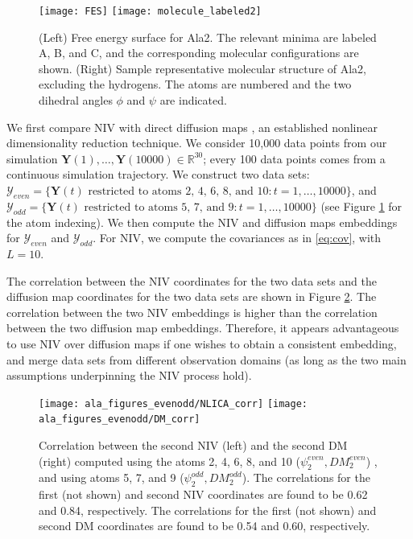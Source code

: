 \documentclass[aip,jcp,preprint]{revtex4-1}
\begin{document}
\begin{figure}[ht]
    \texttt{[image: FES]}
    \texttt{[image: molecule\_labeled2]}
    \caption{(Left) Free energy surface for Ala2. The relevant minima are labeled A, B, and C, and the corresponding molecular configurations are shown.
    (Right) Sample representative molecular structure of Ala2, excluding the hydrogens. The atoms are numbered and the two dihedral angles $\phi$ and $\psi$ are indicated.}
    \label{fig:ala_fes}
\end{figure}


We first compare NIV with direct diffusion maps \cite{coifman2005geometric}, an established nonlinear dimensionality reduction technique.
%
We consider 10,000 data points from our simulation $\mathbf{Y}(1), \dots, \mathbf{Y}(10000) \in \mathbb{R}^{30}$; every 100 data points comes from a continuous simulation trajectory.
%
We construct two data sets:
%
$\mathcal{Y}_{even} = \{\mathbf{Y}(t) \text{ restricted to atoms 2, 4, 6, 8, and 10}: t=1, \dots, 10000 \}$,
and $\mathcal{Y}_{odd} = \{\mathbf{Y}(t) \text{ restricted to atoms 5, 7, and 9}: t=1, \dots, 10000 \}$ (see Figure \ref{fig:ala_fes} for the atom indexing).
%
We then compute the NIV and diffusion maps embeddings for $\mathcal{Y}_{even}$ and $\mathcal{Y}_{odd}$.
%
For NIV, we compute the covariances as in \eqref{eq:cov}, with $L=10$.

The correlation between the NIV coordinates for the two data sets and the diffusion map coordinates for the two data sets are shown in Figure \ref{fig:ala_corr}.
%
The correlation between the two NIV embeddings is higher than the correlation between the two diffusion map embeddings.
Therefore, it appears advantageous to use NIV over diffusion maps if one wishes to obtain a consistent embedding, and merge data sets from different observation domains (as long as the two main assumptions underpinning the NIV process hold).

\begin{figure}[ht]
    \texttt{[image: ala\_figures\_evenodd/NLICA\_corr]}
    \texttt{[image: ala\_figures\_evenodd/DM\_corr]}
    \caption{Correlation between the second NIV (left) and the second DM (right) computed using the atoms 2, 4, 6, 8, and 10 ($\psi_2^{even}, DM_2^{even}$) , and using atoms 5, 7, and 9 ($\psi_2^{odd}, DM_2^{odd}$).
    The correlations for the first (not shown) and second NIV coordinates are found to be 0.62 and 0.84, respectively.
    The correlations for the first (not shown) and second DM coordinates are found to be 0.54 and 0.60, respectively. }
    \label{fig:ala_corr}
\end{figure}
\end{document}
